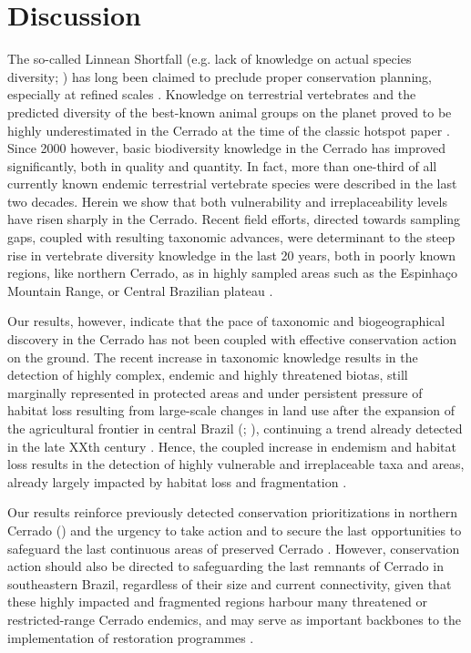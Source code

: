 \documentclass[12pt,openright,oneside,a4paper,english]{abntex2}
\begin{document}
\section{Discussion}

The so-called Linnean Shortfall (e.g. lack of knowledge on actual species diversity; \citealp{Hortal2015}) has long been claimed to preclude proper conservation planning, especially at refined scales \citep{Whittaker2005}. Knowledge on terrestrial vertebrates and the predicted diversity of the best-known animal groups on the planet \citep{Brown1995} proved to be highly underestimated in the Cerrado at the time of the classic hotspot paper \citep{Myers2000}. Since 2000 however, basic biodiversity knowledge in the Cerrado has improved significantly, both in quality and quantity. In fact, more than one-third of all currently known endemic terrestrial vertebrate species were described in the last two decades. Herein we show that both vulnerability and irreplaceability levels have risen sharply in the Cerrado. Recent field efforts, directed towards sampling gaps, coupled with resulting taxonomic advances, were determinant to the steep rise in vertebrate diversity knowledge in the last 20 years, both in poorly known regions, like northern Cerrado, as in highly sampled areas such as the Espinhaço Mountain Range, or Central Brazilian plateau \citep{Nogueira2009, Nogueira2010, Valdujo2012, Azevedo2016, Nogueira2019, Carmignotto2022}.

Our results, however, indicate that the pace of taxonomic and biogeographical discovery in the Cerrado has not been coupled with effective conservation action on the ground. The recent increase in taxonomic knowledge results in the detection of highly complex, endemic and highly threatened biotas, still marginally represented in protected areas and under persistent pressure of habitat loss resulting from large-scale changes in land use after the expansion of the agricultural frontier in central Brazil (\citealp{Pacheco2021}; \citealp[see also][]{VieiraAlencar2023}), continuing a trend already detected in the late XXth century \citep{Ratter1997, KlinkMachado2005}. Hence, the coupled increase in endemism and habitat loss results in the detection of highly vulnerable and irreplaceable taxa and areas, already largely impacted by habitat loss and fragmentation \citep{Strassburg2017, VieiraAlencar2023}.

Our results reinforce previously detected conservation prioritizations in northern Cerrado (\citealp[e.g.][]{Monteiro2020, VieiraAlencar2023}) and the urgency to take action and to secure the last opportunities to safeguard the last continuous areas of preserved Cerrado \citep{VieiraAlencar2023}. However, conservation action should also be directed to safeguarding the last remnants of Cerrado in southeastern Brazil, regardless of their size and current connectivity, given that these highly impacted and fragmented regions harbour many threatened or restricted-range Cerrado endemics, and may serve as important backbones to the implementation of restoration programmes \citep{Strassburg2017, VieiraAlencar2023}.
\end{document}
